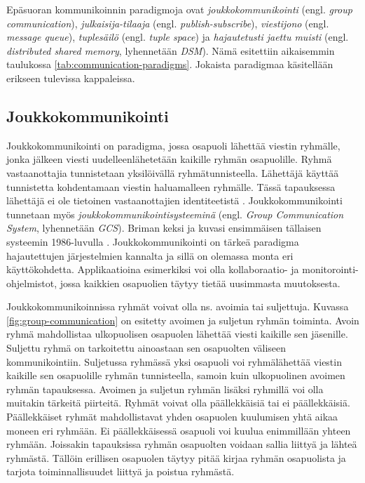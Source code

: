 Epäsuoran kommunikoinnin paradigmoja ovat \emph{joukkokommunikointi} (engl. \emph{group communication}), \emph{julkaisija-tilaaja} (engl. \emph{publish-subscribe}), \emph{viestijono} (engl. \emph{message queue}), \emph{tuplesäilö} (engl. \emph{tuple space}) ja \emph{hajautetusti jaettu muisti} (engl. \emph{distributed shared memory}, lyhennetään \emph{DSM}). Nämä esitettiin aikaisemmin taulukossa \ref{tab:communication-paradigms}. Jokaista paradigmaa käsitellään erikseen tulevissa kappaleissa.



\subsection{Joukkokommunikointi}
Joukkokommunikointi on paradigma, jossa osapuoli lähettää viestin ryhmälle, jonka jälkeen viesti uudelleenlähetetään kaikille ryhmän osapuolille. Ryhmä vastaanottajia tunnistetaan yksilöivällä ryhmätunnisteella. Lähettäjä käyttää tunnistetta kohdentamaan viestin haluamalleen ryhmälle. Tässä tapauksessa lähettäjä ei ole tietoinen vastaanottajien identiteetistä \cite[s.~232--233]{distributed-systems-concepts-and-design}. Joukkokommunikointi tunnetaan myös \emph{joukkokommunikointisysteeminä} (engl. \emph{Group Communication System}, lyhennetään \emph{GCS}). Briman keksi ja kuvasi ensimmäisen tällaisen systeemin 1986-luvulla \cite{isis-fault-tolerant-distributed-computing}. Joukkokommunikointi on tärkeä paradigma hajautettujen järjestelmien kannalta ja sillä on olemassa monta eri käyttökohdetta. Applikaatioina esimerkiksi voi olla kollaboraatio- ja monitorointi-ohjelmistot, jossa kaikkien osapuolien täytyy tietää uusimmasta muutoksesta.

Joukkokommunikoinnissa ryhmät voivat olla ns. avoimia tai suljettuja. Kuvassa \ref{fig:group-communication} on esitetty avoimen ja suljetun ryhmän toiminta. Avoin ryhmä mahdollistaa ulkopuolisen osapuolen lähettää viesti kaikille sen jäsenille. Suljettu ryhmä on tarkoitettu ainoastaan sen osapuolten väliseen kommunikointiin. Suljetussa ryhmässä yksi osapuoli voi ryhmälähettää viestin kaikille sen osapuolille ryhmän tunnisteella, samoin kuin ulkopuolinen avoimen ryhmän tapauksessa. Avoimen ja suljetun ryhmän lisäksi ryhmillä voi olla muitakin tärkeitä piirteitä. Ryhmät voivat olla päällekkäisiä tai ei päällekkäisiä. Päällekkäiset ryhmät mahdollistavat yhden osapuolen kuulumisen yhtä aikaa moneen eri ryhmään. Ei päällekkäisessä osapuoli voi kuulua enimmillään yhteen ryhmään. Joissakin tapauksissa ryhmän osapuolten voidaan sallia liittyä ja lähteä ryhmästä. Tällöin erillisen osapuolen täytyy pitää kirjaa ryhmän osapuolista ja tarjota toiminnallisuudet liittyä ja poistua ryhmästä. \mbox{\cite[s.~233--235]{distributed-systems-concepts-and-design}} \mbox{\cite[s.~48]{process-group-approach-briman}}

